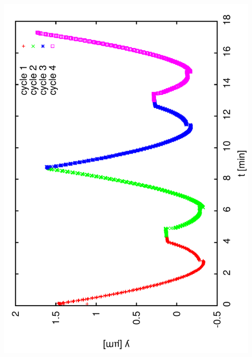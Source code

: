 \documentclass[a4paper,11pt]{book}
\begin{document}
\includegraphics[angle=-90,scale=0.15]{image61.pdf}
\end{document}
